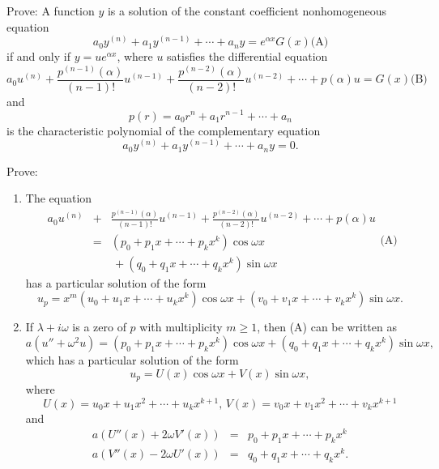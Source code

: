\documentclass{ximera}
\begin{document}
\begin{problem}\label{exer:9.3.75}
Prove:
A function $y$ is a solution of the constant coefficient
nonhomogeneous equation
$$
a_0y^{(n)}+a_1y^{(n-1)}+\cdots+a_ny=e^{\alpha x}G(x)
\text{(A)}
$$
if and only if $y=ue^{\alpha x}$, where $u$ satisfies the differential
equation
$$
a_0u^{(n)}+\frac{p^{(n-1)}(\alpha)}{(n-1)!}u^{(n-1)}+
\frac{p^{(n-2)}(\alpha)}{(n-2)!}u^{(n-2)}+\cdots+p(\alpha)u=G(x)
\text{(B)}
$$
and
$$
p(r)=a_0r^n+a_1r^{n-1} + \cdots + a_n
$$
is the characteristic polynomial of the complementary equation
$$
a_0y^{(n)}+a_1y^{(n-1)}+\cdots+a_ny=0.
$$
\end{problem}

\begin{problem}\label{exer:9.3.76}
Prove:
\begin{enumerate}
\item %
The equation
$$
\begin{array}{lcl}
a_0u^{(n)}&+&\frac{p^{(n-1)}(\alpha)}{(n-1)!}u^{(n-1)}+
\frac{p^{(n-2)}(\alpha)}{(n-2)!}u^{(n-2)}+\cdots+p(\alpha)u\\
&=&\left(p_0+p_1x+\cdots+p_kx^k\right)\cos
\omega x\\&&\,+ \left(q_0+q_1x+\cdots+q_kx^k\right)\sin\omega x
\end{array}
\text{(A)}
$$
has a particular solution of the form
$$
u_p=x^m\left(u_0+u_1x+\cdots+u_kx^k\right)\cos\omega x+
\left(v_0+v_1x+\cdots+v_kx^k\right)\sin\omega x.
$$
\item %
If $\lambda+i\omega$ is a zero of $p$ with multiplicity $m\ge1$, then
(A) can be written as
$$
a(u''+\omega^2 u)=
\left(p_0+p_1x+\cdots+p_kx^k\right)\cos\omega x+
\left(q_0+q_1x+\cdots+q_kx^k\right)\sin\omega x,
$$
which has a particular solution of the form
$$
u_p=U(x)\cos\omega x+V(x)\sin\omega x,
$$
where
$$
U(x)=u_0x+u_1x^2+\cdots+u_kx^{k+1},\,V(x)=v_0x+v_1x^2+\cdots+v_kx^{k+1}
$$
and
$$
\begin{array}{rcl}
a(U''(x)+2\omega V'(x))&=&p_0+p_1x+\cdots+p_kx^k\\
a(V''(x)-2\omega U'(x))&=&q_0+q_1x+\cdots+q_kx^k.
\end{array}
$$
\end{enumerate}
\end{problem}
\end{document}
